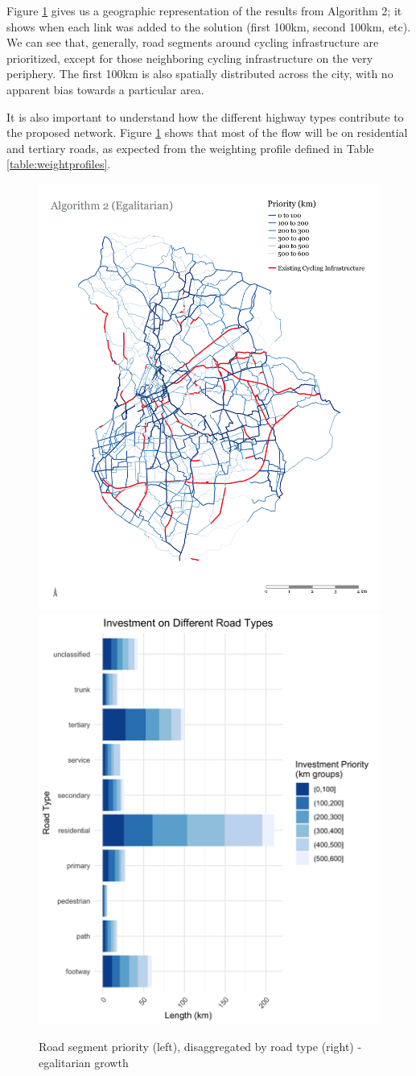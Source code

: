 \documentclass[
]{article}
\begin{document}
Figure \ref{fig:growth3MapandBar} gives us a geographic representation
of the results from Algorithm 2; it shows when each link was added to
the solution (first 100km, second 100km, etc). We can see that,
generally, road segments around cycling infrastructure are prioritized,
except for those neighboring cycling infrastructure on the very
periphery. The first 100km is also spatially distributed across the
city, with no apparent bias towards a particular area.

It is also important to understand how the different highway types
contribute to the proposed network. Figure \ref{fig:growth3MapandBar}
shows that most of the flow will be on residential and tertiary roads,
as expected from the weighting profile defined in Table
\ref{table:weightprofiles}.

\begin{figure}

{\centering \includegraphics[width=0.45\linewidth]{data/Manchester/Plots/Growth_Results/growth_egalitarian_priority_all_FLOW} \includegraphics[width=0.45\linewidth]{data/Manchester/Plots/Growth_Results/growth_egalitarian_investment_highways_flow} 

}

\caption{Road segment priority (left), disaggregated by road type (right) - egalitarian growth}\label{fig:growth3MapandBar}
\end{figure}
\end{document}
